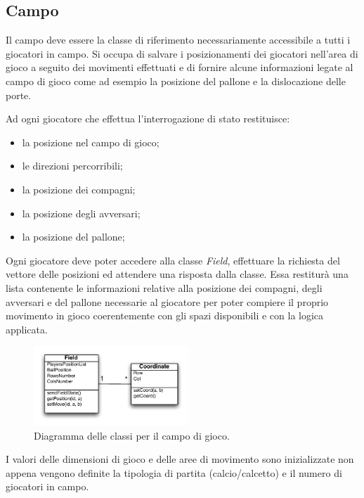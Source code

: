 \documentclass[aps,letterpaper,10pt]{article}
\begin{document}
\subsection{Campo}

Il campo deve essere la classe di riferimento necessariamente accessibile a tutti i giocatori in campo. Si occupa di salvare i posizionamenti dei giocatori nell'area di gioco a seguito dei movimenti effettuati e di fornire alcune informazioni legate al campo di gioco come ad esempio la posizione del pallone e la dislocazione delle porte. \vspace{3mm}

Ad ogni giocatore che effettua l'interrogazione di stato restituisce:

\begin{itemize}
	\item la posizione nel campo di gioco;
	\item le direzioni percorribili;
	\item la posizione dei compagni;
	\item la posizione degli avversari;
	\item la posizione del pallone;
\end{itemize}

Ogni giocatore deve poter accedere alla classe \emph{Field}, effettuare la richiesta del vettore delle posizioni ed attendere una risposta dalla classe. Essa restitur\`a una lista contenente le informazioni relative alla posizione dei compagni, degli avversari e del pallone necessarie al giocatore per poter compiere il proprio movimento in gioco coerentemente con gli spazi disponibili e con la logica applicata. \vspace{3mm}

\begin{figure}[H]
	\begin{center}
		\includegraphics[width=220px]{images/field-class.pdf}
	\end{center}
\caption{Diagramma delle classi per il campo di gioco.}
\end{figure}

I valori delle dimensioni di gioco e delle aree di movimento sono inizializzate non appena vengono definite la tipologia di partita (calcio/calcetto) e il numero di giocatori in campo. \vspace{3mm} 
\end{document}
